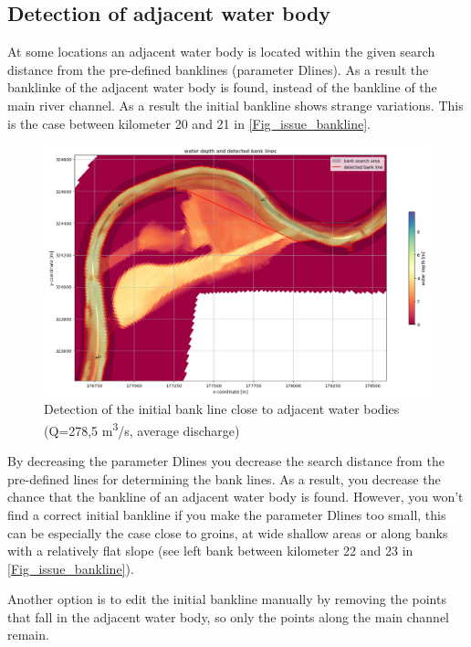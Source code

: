 \subsection{Detection of adjacent water body}
At some locations an adjacent water body is located within the given search distance from the pre-defined banklines (parameter Dlines). As a result the banklinke of the adjacent water body is found, instead of the bankline of the main river channel. As a result the initial bankline shows strange variations. This is the case between kilometer 20 and 21 in \autoref{Fig_issue_bankline}.

\begin{figure}[!hb]
	\includegraphics[width=\textwidth]{figures/detection_issue.png}
	\caption{Detection of the initial bank line close to adjacent water bodies (Q=278,5 m\textsuperscript{3}/s, average discharge)}
	\label{Fig_issue_bankline}
\end{figure}

By decreasing the parameter Dlines you decrease the search distance from the pre-defined lines for determining the bank lines. As a result, you decrease the chance that the bankline of an adjacent water  body is found. However, you won't find a correct initial bankline if you make the parameter Dlines too small, this can be especially the case close to groins, at wide shallow areas or along banks with a relatively flat slope (see left bank between kilometer 22 and 23 in \autoref{Fig_issue_bankline}).

Another option is to edit the initial bankline manually by removing the points that fall in the adjacent water body, so only the points along the main channel remain.

